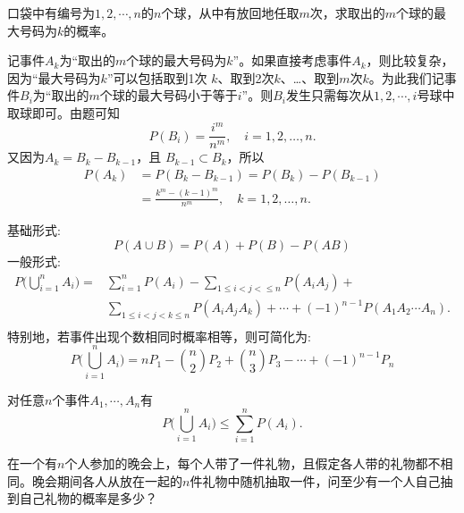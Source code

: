 \begin{example}
    口袋中有编号为$1, 2, \cdots, n$的$n$个球，从中有放回地任取$m$次，求取出的$m$个球的最大号码为$k$的概率。
\end{example}
\begin{solution}
    记事件$A_k$为“取出的$m$个球的最大号码为$k$”。如果直接考虑事件$A_k$，则比较复杂，因为“最大号码为$k$”可以包括取到1次 $k$、取到2次$k$、\dots、取到$m$次$k$。为此我们记事件$B_i$为“取出的$m$个球的最大号码小于等于$i$”。则$B_i$发生只需每次从$1,2,\cdots ,i$号球中取球即可。由题可知
    \[  P(B_i) = \frac{i^m}{n^m}, \quad i = 1, 2, \dotsc, n. \]
    又因为$A_k = B_k - B_{k-1}$，且 $B_{k-1} \subset B_k$，所以
    \begin{align*}
        P(A_k) & = P(B_k - B_{k-1}) = P(B_k) - P(B_{k-1})                 \\
               & = \frac{k^m - (k - 1)^m}{n^m}, \quad k = 1,2, \dotsc, n.
    \end{align*}
\end{solution}

\begin{proposition}[加法公式]\label{pro:addition_law}
    基础形式:
    \[ P(A \cup B) = P(A) + P(B) - P(AB) \]
    一般形式:
    \begin{align*}
        P\biggl(\bigcup_{i=1}^n A_i \biggr)= & \sum_{i=1}^n P (A_i) - \sum_{1\le i < j < \le n}P(A_i A_j)+                             \\
                                             & \sum_{1 \le i < j < k \le n} P(A_i A_j A_k)+ \dotsb + (-1)^{n-1} P(A_1 A_2 \dotsb A_n). \\
    \end{align*}
    特别地，若事件出现个数相同时概率相等，则可简化为:
    \[ P\biggl( \bigcup_{i=1}^n A_i \biggr)=n P_{1} - \binom{n}{2} P_{2} + \binom{n}{3} P_{3}- \cdots+(-1)^{n-1} P_{n} \]
\end{proposition}

\begin{corollary}
    对任意$n$个事件$A_1,\cdots ,A_n$有
    \[ P \biggl( \bigcup_{i=1}^n A_i \biggr) \le \sum _{i=1} ^n P (A_i). \]
\end{corollary}

\begin{example}[配对问题]\label{exam:pairing}
    在一个有$n$个人参加的晚会上，每个人带了一件礼物，且假定各人带的礼物都不相同。晚会期间各人从放在一起的$n$件礼物中随机抽取一件，问至少有一个人自己抽到自己礼物的概率是多少？
\end{example}

